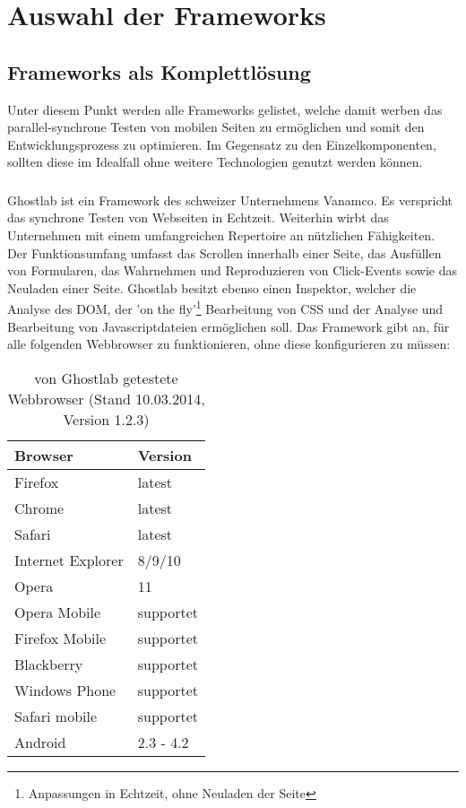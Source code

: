 \chapter{Auswahl der \Gls{Framework}s}

\section{Frameworks als Komplettlösung}
Unter diesem Punkt werden alle \Gls{Framework}s gelistet, welche damit werben das \gls{parallel-synchron}e Testen von mobilen Seiten zu ermöglichen und somit den Entwicklungsprozess zu optimieren. Im Gegensatz zu den Einzelkomponenten, sollten diese im Idealfall ohne weitere Technologien genutzt werden können.
	
	\subsection{}
	Ghostlab ist ein \Gls{Framework} des schweizer Unternehmens Vanamco. Es verspricht das synchrone Testen von Webseiten in Echtzeit. Weiterhin wirbt das Unternehmen mit einem umfangreichen Repertoire an nützlichen Fähigkeiten. Der Funktionsumfang umfasst das Scrollen innerhalb einer Seite, das Ausfüllen von  Formularen, das Wahrnehmen und Reproduzieren von Click-Events sowie das Neuladen einer Seite. Ghostlab besitzt ebenso einen Inspektor, welcher die Analyse des \Gls{DOM}, der 'on the fly'\footnote{Anpassungen in Echtzeit, ohne Neuladen der Seite} Bearbeitung von CSS und der Analyse und Bearbeitung von \Gls{Javascript}dateien ermöglichen soll. Das \Gls{Framework} gibt an, für alle folgenden \Gls{Webbrowser} zu funktionieren, ohne diese konfigurieren zu müssen:

	\begin{table}[H]
 		\centering
			\begin{tabular}{| p{5cm} | p{5cm} |}
			
			\hline
				Browser 	& 	Version\\
			\hline
			\hline
				Firefox	&	latest\\
				Chrome	&	latest\\
				Safari	&	latest\\
				Internet Explorer	&	8/9/10\\
				Opera	&	11\\
				Opera Mobile	&	supportet\\
				Firefox Mobile	&	supportet\\
				Blackberry	&	supportet\\
				Windows Phone	&	supportet\\
				Safari mobile	&	supportet\\	
				Android	&	2.3 - 4.2\\
				\hline
				\end{tabular}
			\caption{von Ghostlab getestete \Gls{Webbrowser} (Stand 10.03.2014, Version 1.2.3)}
	\end{table}

